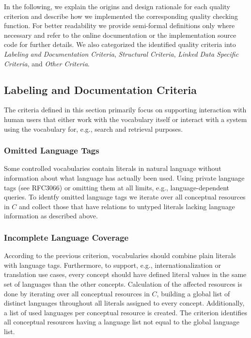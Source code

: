 
In the following, we explain the origins and design rationale for each quality criterion and describe how we implemented the corresponding quality checking function. For better readability we provide semi-formal definitions only where necessary and refer to the online documentation or the implementation source code for further details. We also categorized the identified quality criteria into \emph{Labeling and Documentation Criteria}, \emph{Structural Criteria}, \emph{Linked Data Specific Criteria}, and \emph{Other Criteria}. 


\subsection{Labeling and Documentation Criteria}

The criteria defined in this section primarily focus on supporting interaction with human users that either work with the vocabulary itself or interact with a system using the vocabulary for, e.g., search and retrieval purposes.

\subsubsection{Omitted Language Tags}
Some controlled vocabularies contain literals in natural language without information about what language has actually been used. Using private language tags (see RFC3066) or omitting them at all limits, e.g., language-dependent queries. To identfy omitted language tags we iterate over all conceptual resources in $C$ and collect those that have relations to untyped literals lacking language information as described above. 

\subsubsection{Incomplete Language Coverage}
According to the previous criterion, vocabularies should combine plain literals with language tags. Furthermore, to support, e.g., internationalization or translation use cases, every concept should have defined literal values in the same set of languages than the other concepts. Calculation of the affected resources is done by iterating over all conceptual resources in $C$, building a global list of distinct languages throughout all literals assigned to every concept. Additionally, a list of used languages per conceptual resource is created. The criterion identifies all conceptual resources having a language list not equal to the global language list. 

